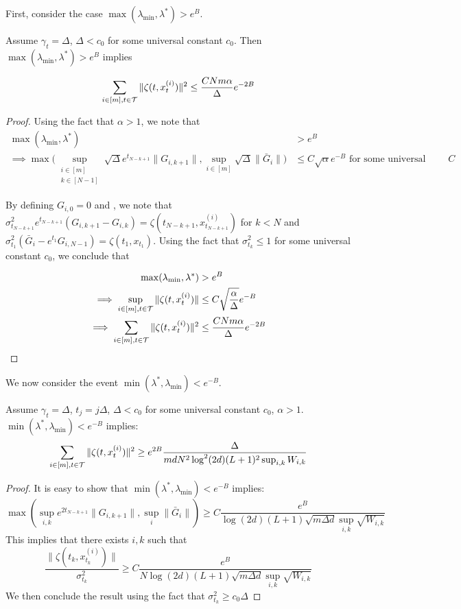 First, consider the case $\max(\lambda_{\min},\lambda^{*}) > e^{B}$. 
\begin{lemma}\label{lemma:large_lambda}
Assume $\gamma_{t} = \Delta$, $\Delta< c_0$ for some universal constant $c_0$. Then $\max(\lambda_{\min},\lambda^{*}) > e^{B}$ implies 

$$\sum_{i \in [m], t\in \mathcal{T}}\|\zeta(t,x_t^{(i)})\|^2 \leq \frac{CNm\alpha}{\Delta}e^{-2B}$$
\end{lemma}
\begin{proof}
Using the fact that $\alpha >1$, we note that  
\begin{align}
\max(\lambda_{\min},\lambda^{*}) &> e^{B} \nonumber\\
\implies \max\bigr(\sup_{\substack{i\in [m]\\ k\in [N-1]}}\sqrt{\Delta}e^{t_{N-k+1}}\|G_{i,k+1}\|,\sup_{i\in [m]}\sqrt{\Delta}\|\bar{G}_{i}\|\bigr) &\leq C\sqrt{\alpha}e^{-B} \text{ for some universal constant } C
\end{align} 

By defining $G_{i,0} = 0$ and , we note that $\sigma_{t_{N-k+1}}^2e^{t_{N-k+1}}(G_{i,k+1}-G_{i,k}) = \zeta(t_{N-k+1},x_{t_{N-k+1}}^{(i)})$ for $k < N$ and $\sigma_{t_1}^2(\bar{G}_i-e^{t_1}G_{i,N-1}) = \zeta(t_1,x_{t_1})$. Using the fact that $\sigma_{t_k}^2 \leq 1$ for some universal constant $c_0$, we conclude that  

\begin{align}
\max(\lambda_{\min},\lambda^{*}) &> e^{B} \nonumber\\
\implies \sup_{i\in [m],t\in \mathcal{T}}\|\zeta(t,x_t^{(i)})\| &\leq C\sqrt{\frac{\alpha}{\Delta}}e^{-B} \nonumber \\
\implies \sum_{i \in [m], t\in \mathcal{T}}\|\zeta(t,x_t^{(i)})\|^2 &\leq \frac{CNm\alpha}{\Delta}e^{-2B}
\end{align} 

\end{proof}


We now consider the event $\min(\lambda^{*},\lambda_{\min}) < e^{-B}$.

\begin{lemma}\label{lemma:small_lambda}
Assume $\gamma_{t} = \Delta$, $t_j = j\Delta$, $\Delta < c_0$ for some universal constant $c_0$, $\alpha > 1$.  $\min(\lambda^{*},\lambda_{\min}) < e^{-B}$ implies:
$$\sum_{i \in [m], t\in \mathcal{T}}\|\zeta(t,x_t^{(i)})\|^2 \geq e^{2B}\frac{\Delta}{md N^2 \log^2(2d)(L+1)^2\sup_{i,k}W_{i,k}}$$
\end{lemma}
\begin{proof}
It is easy to show that $\min(\lambda^{*},\lambda_{\min}) < e^{-B}$ implies:
 $$\max(\sup_{i,k}e^{2t_{N-k+1}}\|G_{i,k+1}\|,\sup_i\|\bar{G}_i\|) \geq C\frac{e^{B}}{\log(2d)(L+1)\sqrt{m\Delta d} \sup_{i,k}\sqrt{W_{i,k}}}$$
 This implies that there exists $i,k$ such that $$\frac{\|\zeta(t_k,x_{t_k}^{(i)})\|}{\sigma_{t_k}^2} \geq C\frac{e^{B}}{N\log(2d)(L+1)\sqrt{m\Delta d} \sup_{i,k}\sqrt{W_{i,k}}} $$
 We then conclude the result using the fact that $\sigma_{t_k}^2 \geq c_0\Delta$
\end{proof}

